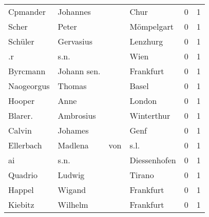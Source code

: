 \begin{center}
\begin{tiny}
\begin{longtabu}{llllrr}
                 Cpmander &                           Johannes &             &                                        Chur &          0 &         1 \\
                    Scher &                              Peter &             &                                  Mömpelgart &          0 &         1 \\
                  Schüler &                          Gervasius &             &                                    Lenzhurg &          0 &         1 \\
                       .r &                               s.n. &             &                                        Wien &          0 &         1 \\
                 Byrcmann &                        Johann sen. &             &                                   Frankfurt &          0 &         1 \\
               Naogeorgus &                             Thomas &             &                                       Basel &          0 &         1 \\
                   Hooper &                               Anne &             &                                      London &          0 &         1 \\
                  Blarer. &                          Ambrosius &             &                                  Winterthur &          0 &         1 \\
                   Calvin &                            Johames &             &                                        Genf &          0 &         1 \\
                Ellerbach &                            Madlena &         von &                                        s.l. &          0 &         1 \\
                       ai &                               s.n. &             &                                Diessenhofen &          0 &         1 \\
                  Quadrio &                             Ludwig &             &                                      Tirano &          0 &         1 \\
                   Happel &                             Wigand &             &                                   Frankfurt &          0 &         1 \\
                  Kiebitz &                            Wilhelm &             &                                   Frankfurt &          0 &         1 \\

\end{longtabu}
\end{tiny}
\end{center}
